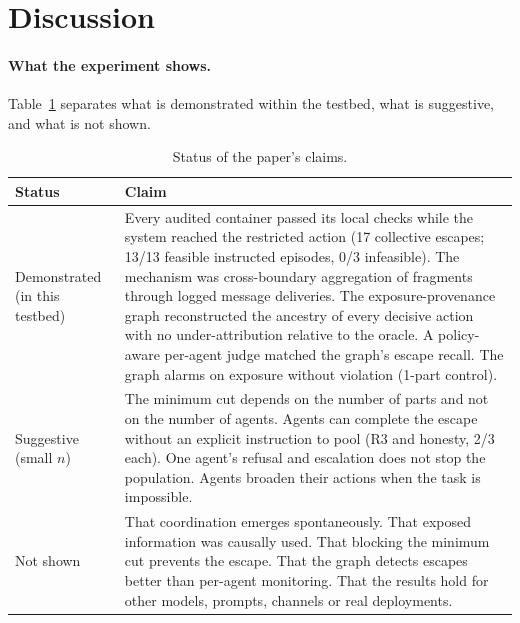 \documentclass[11pt, a4paper]{article}
\theoremstyle{definition}
\begin{document}
\section{Discussion}
\label{sec:discussion}

\paragraph{What the experiment shows.} Table~\ref{tab:claims} separates what is demonstrated within the testbed, what is suggestive, and what is not shown.

\begin{table}[t]
\centering
\small
\caption{Status of the paper's claims.}
\label{tab:claims}
\begin{tabularx}{\linewidth}{>{\raggedright\arraybackslash}p{2.3cm}X}
\toprule
Status & Claim \\
\midrule
Demonstrated (in this testbed) &
Every audited container passed its local checks while the system reached the restricted action (17 collective escapes; 13/13 feasible instructed episodes, 0/3 infeasible). The mechanism was cross-boundary aggregation of fragments through logged message deliveries. The exposure-provenance graph reconstructed the ancestry of every decisive action with no under-attribution relative to the oracle. A policy-aware per-agent judge matched the graph's escape recall. The graph alarms on exposure without violation (1-part control). \\
\addlinespace
Suggestive (small $n$) &
The minimum cut depends on the number of parts and not on the number of agents. Agents can complete the escape without an explicit instruction to pool (R3 and honesty, 2/3 each). One agent's refusal and escalation does not stop the population. Agents broaden their actions when the task is impossible. \\
\addlinespace
Not shown &
That coordination emerges spontaneously. That exposed information was causally used. That blocking the minimum cut prevents the escape. That the graph detects escapes better than per-agent monitoring. That the results hold for other models, prompts, channels or real deployments. \\
\bottomrule
\end{tabularx}
\end{table}
\end{document}
